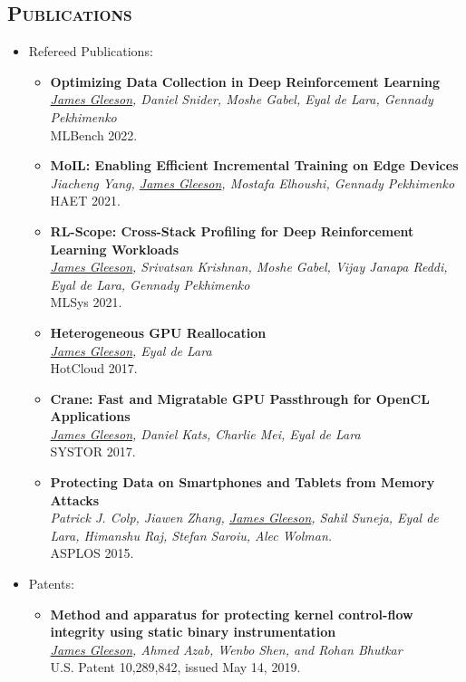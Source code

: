 \documentclass[letterpaper,11pt]{article}
\newcommand{\BulletZeroLeftMargin}{1.5em}
\newcommand{\heading}[1]{%
    \textsc{\textbf{#1}}
}
\newcommand*\resheading[1]{\subsection*{\heading{#1}}\vspace{0.3em}\nopagebreak[4]}
\newcommand{\resitem}[1]{\item #1 \vspace{-2pt}}
\newcommand{\ressubheadingnodate}[1]{#1:}
\begin{document}
\resheading{Publications}
\begin{itemize}[leftmargin=\BulletZeroLeftMargin]
\item

	\ressubheadingnodate{Refereed Publications}
    \begin{itemize}[leftmargin=\BulletZeroLeftMargin]
        \resitem{
            \textbf{Optimizing Data Collection in Deep Reinforcement Learning} \\
            \textit{\underline{James Gleeson}, Daniel Snider, Moshe Gabel, Eyal de Lara, Gennady Pekhimenko} \\
            MLBench 2022.
        }
        \resitem{
            \textbf{MoIL: Enabling Efficient Incremental Training on Edge Devices} \\
            \textit{Jiacheng Yang, \underline{James Gleeson}, Mostafa Elhoushi, Gennady Pekhimenko} \\
            HAET 2021.
        }
        \resitem{
            \textbf{RL-Scope: Cross-Stack Profiling for Deep Reinforcement Learning Workloads} \\
            \textit{\underline{James Gleeson}, Srivatsan Krishnan, Moshe Gabel, Vijay Janapa Reddi, Eyal de Lara, Gennady Pekhimenko} \\
            MLSys 2021.
        }
        \resitem{
            \textbf{Heterogeneous GPU Reallocation} \\
            \textit{\underline{James Gleeson}, Eyal de Lara} \\
            HotCloud 2017.
        }
        \resitem{
            \textbf{Crane: Fast and Migratable GPU Passthrough for OpenCL Applications} \\
            \textit{\underline{James Gleeson}, Daniel Kats, Charlie Mei, Eyal de Lara} \\
            SYSTOR 2017.
        }
		\resitem{
            \textbf{Protecting Data on Smartphones and Tablets from Memory Attacks} \\
            \textit{Patrick J. Colp, Jiawen Zhang, \underline{James Gleeson}, Sahil Suneja, Eyal de Lara, Himanshu Raj, Stefan Saroiu, Alec Wolman.} \\
            ASPLOS 2015.
        }
	\end{itemize}
    \item
	\ressubheadingnodate{Patents}
    \begin{itemize}[leftmargin=\BulletZeroLeftMargin]
        \resitem{
            \textbf{Method and apparatus for protecting kernel control-flow integrity using static binary instrumentation} \\
            \textit{\underline{James Gleeson}, Ahmed Azab, Wenbo Shen, and Rohan Bhutkar} \\
            U.S. Patent 10,289,842, issued May 14, 2019.
        }
	\end{itemize}

\end{itemize}
\end{document}
